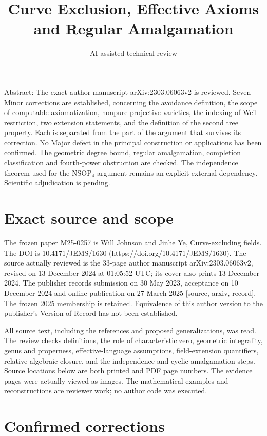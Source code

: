 \documentclass[10pt]{article}
\title{Curve Exclusion, Effective Axioms
and Regular Amalgamation}
\author{AI-assisted technical review}
\date{}
\begin{document}
\maketitle
Abstract: The exact author manuscript arXiv:2303.06063v2 is reviewed. Seven Minor corrections are established, concerning the avoidance definition, the scope of computable axiomatization, nonpure projective varieties, the indexing of Weil restriction, two extension statements, and the definition of the second tree property. Each is separated from the part of the argument that survives its correction. No Major defect in the principal construction or applications has been confirmed. The geometric degree bound, regular amalgamation, completion classification and fourth-power obstruction are checked. The independence theorem used for the NSOP\(_4\) argument remains an explicit external dependency. Scientific adjudication is pending.\par
\section*{Exact source and scope}
The frozen paper M25-0257 is Will Johnson and Jinhe Ye, Curve-excluding fields. The DOI is 10.4171/JEMS/1630 (https://doi.org/10.4171/JEMS/1630). The source actually reviewed is the 33-page author manuscript arXiv:2303.06063v2, revised on 13 December 2024 at 01:05:52 UTC; its cover also prints 13 December 2024. The publisher records submission on 30 May 2023, acceptance on 10 December 2024 and online publication on 27 March 2025 [source, arxiv, record]. The frozen 2025 membership is retained. Equivalence of this author version to the publisher’s Version of Record has not been established.\par
All source text, including the references and proposed generalizations, was read. The review checks definitions, the role of characteristic zero, geometric integrality, genus and properness, effective-language assumptions, field-extension quantifiers, relative algebraic closure, and the independence and cyclic-amalgamation steps. Source locations below are both printed and PDF page numbers. The evidence pages were actually viewed as images. The mathematical examples and reconstructions are reviewer work; no author code was executed.\par
\section*{Confirmed corrections}
\end{document}
